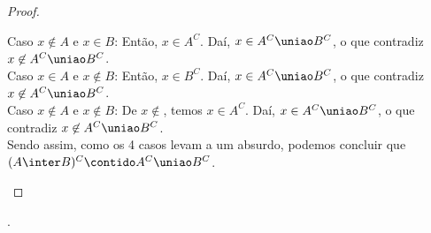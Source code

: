 \begin{proof}
\begin{enumerate}
\begin{enumerate}
                    Caso $x \not\in A$ e $x \in B$: Então, $x \in A^C$. Daí, $x \in A^C \uniao B^C$, o que contradiz $x \not\in A^C \uniao B^C$.\\
                    Caso $x \in A$ e $x \not\in B$: Então, $x \in B^C$. Daí, $x \in A^C \uniao B^C$, o que contradiz $x \not\in A^C \uniao B^C$.\\
                    Caso $x \not\in A$ e $x \not\in B$: De $x \not\in $, temos $x \in A^C$. Daí, $x \in A^C \uniao B^C$, o que contradiz $x \not\in A^C \uniao B^C$.\\
                    Sendo assim, como os 4 casos levam a um absurdo, podemos concluir que $(A \inter B)^C \contido A^C \uniao B^C$.
            \end{enumerate}
    \end{enumerate}
\end{proof}

\begin{onlineact}
    .
\end{onlineact}
